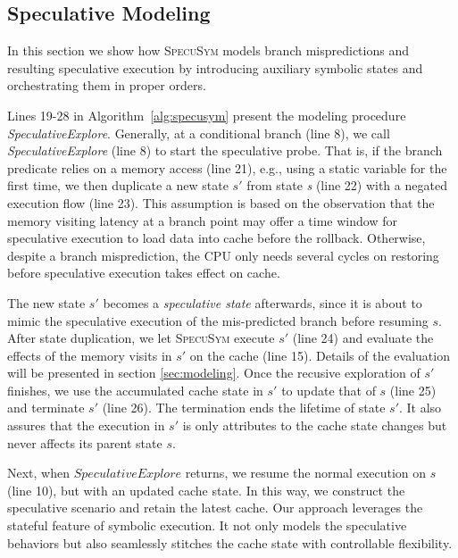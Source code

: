 \documentclass[sigconf, review]{acmart}
\newcommand{\SpecuSym}{\textsc{SpecuSym} }
\begin{document}
\subsection{Speculative Modeling}
\label{sec:spec_modeling}


In this section we show how \SpecuSym models branch mispredictions and
resulting speculative execution by introducing auxiliary symbolic states 
and orchestrating them in proper orders.


Lines 19-28 in Algorithm~\ref{alg:specusym} present the modeling procedure 
\textit{SpeculativeExplore}. Generally, at a conditional branch (line 8), 
we call \textit{SpeculativeExplore} (line 8) to start the speculative probe. 
That is, if the branch predicate relies on a memory access (line 21), e.g.,
using a static variable for the first time, we then duplicate a new state 
$s'$ from state \textit{s} (line 22) with a negated execution flow (line 23). 
This assumption is based on the observation that the memory visiting latency 
at a branch point may offer a time window for speculative execution to load 
data into cache before the rollback. Otherwise, despite a branch misprediction, 
the CPU only needs several cycles on restoring before speculative execution 
takes effect on cache.



The new state ${s'}$ becomes a \textit{speculative state} afterwards, since 
it is about to mimic the speculative execution of the mis-predicted branch 
before resuming $s$. After state duplication, we let \SpecuSym execute $s'$ 
(line 24) and evaluate the effects of the memory visits in $s'$ on the cache 
(line 15). Details of the evaluation will be presented in section
\ref{sec:modeling}. Once the recusive exploration of $s'$ finishes, we use 
the accumulated cache state in $s'$ to update that of $s$ (line 25) and 
terminate $s'$ (line 26). The termination ends the lifetime of state $s'$. 
It also assures that the execution in $s'$ is only attributes to the cache 
state changes but never affects its parent state $s$.


Next, when $\mathit{SpeculativeExplore}$ returns, we resume the normal 
execution on $s$ (line 10), but with an updated cache state. In this way, 
we construct the speculative scenario and retain the latest cache. Our 
approach leverages the stateful feature of symbolic execution. It not only 
models the speculative behaviors but also seamlessly stitches the cache
state with controllable flexibility. 
\end{document}
